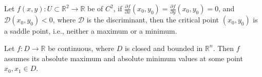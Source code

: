 \documentclass[openany]{book}
\newcommand{\R}{\mathbb{R}}
\begin{document}

\begin{prop}
    Let $f(x,y):U\subset\R^2\to \R$ be of  $C^2$, if $\frac{\partial f}{\partial x}(x_0,y_0)=\frac{\partial f}{\partial y}(x_0,y_0)=0$, and $\mathcal{D}(x_0,y_0)<0$, where $\mathcal{D}$ is the discriminant, then the critical point $(x_0,y_0)$ is a saddle point, i.e., neither a maximum or a minimum.
\end{prop}


\begin{prop}
    Let $f:D\to\R$ be continuous, where $D$ is closed and bounded in $\R^n$. Then $f$ assumes its absolute maximum and absolute minimum values at some point $x_0, x_1\in D$.
\end{prop}
\end{document}
